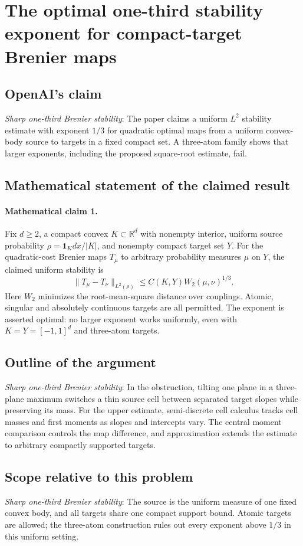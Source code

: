 \documentclass[11pt]{article}
\begin{document}
\section*{The optimal one-third stability exponent for compact-target Brenier maps}

\subsection{OpenAI's claim}
\textit{Sharp one-third Brenier stability}: The paper claims a uniform $L^2$ stability estimate with exponent $1/3$ for quadratic optimal maps from a uniform convex-body source to targets in a fixed compact set. A three-atom family shows that larger exponents, including the proposed square-root estimate, fail.

\subsection{Mathematical statement of the claimed result}
\paragraph{Mathematical claim 1.} Fix $d\ge2$, a compact convex $K\subset\mathbb R^d$ with nonempty interior, uniform source probability $\rho=\mathbf1_Kdx/|K|$, and nonempty compact target set $Y$. For the quadratic-cost Brenier maps $T_\mu$ to arbitrary probability measures $\mu$ on $Y$, the claimed uniform stability is \[\|T_\mu-T_\nu\|_{L^2(\rho)}\le C(K,Y)W_2(\mu,\nu)^{1/3}.\] Here $W_2$ minimizes the root-mean-square distance over couplings. Atomic, singular and absolutely continuous targets are all permitted. The exponent is asserted optimal: no larger exponent works uniformly, even with $K=Y=[-1,1]^d$ and three-atom targets.

\subsection{Outline of the argument}
\textit{Sharp one-third Brenier stability}: In the obstruction, tilting one plane in a three-plane maximum switches a thin source cell between separated target slopes while preserving its mass. For the upper estimate, semi-discrete cell calculus tracks cell masses and first moments as slopes and intercepts vary. The central moment comparison controls the map difference, and approximation extends the estimate to arbitrary compactly supported targets.

\subsection{Scope relative to this problem}
\textit{Sharp one-third Brenier stability}: The source is the uniform measure of one fixed convex body, and all targets share one compact support bound. Atomic targets are allowed; the three-atom construction rules out every exponent above $1/3$ in this uniform setting.
\end{document}
